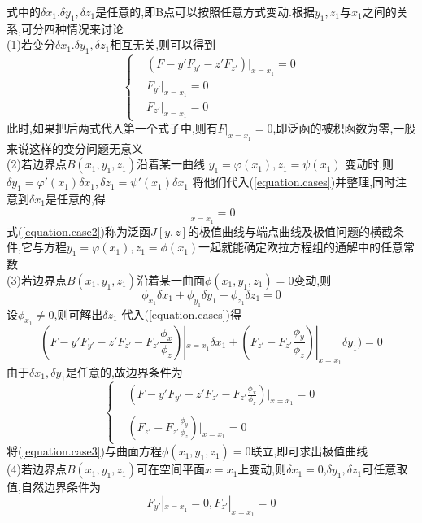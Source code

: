 \documentclass{book}
\begin{document}
式中的$\delta x_1.\delta y_1,\delta z_1$是任意的,即B点可以按照任意方式变动.根据$y_1,z_1与x_1$之间的关系,可分四种情况来讨论
\\
(1)若变分$\delta x_1.\delta y_1,\delta z_1$相互无关,则可以得到
$$
\left\{
  \begin{array}{ll}
     & (F - y'F_{y'} - z'F_{z'})|_{x=x_1}=0 \\
     &  F_{y'}|_{x=x_1}=0\\
     & F_{z'}|_{x=x_1}=0
  \end{array}
\right.
$$
此时,如果把后两式代入第一个式子中,则有$F|_{x=x_1}=0$,即泛函的被积函数为零,一般来说这样的变分问题无意义 \\
(2)若边界点$B(x_1,y_1,z_1)$沿着某一曲线 $y_1=\varphi(x_1),z_1=\psi(x_1)$ 变动时,则
$\delta y_1=\varphi'(x_1)\delta x_1,\delta z_1=\psi'(x_1)\delta x_1$
将他们代入(\ref{equation.cases})并整理,同时注意到$\delta x_1$是任意的,得
\begin{equation}
 [F + (\varphi' - y')F_{y'} + (\psi' -z')F_{z'}]|_{x=x_1}=0
\label{equation.case2}
\end{equation}
式(\ref{equation.case2})称为泛函$J[y,z]$的极值曲线与端点曲线及极值问题的横截条件,它与方程$y_1=\varphi(x_1),z_1=\phi(x_1)$一起就能确定欧拉方程组的通解中的任意常数 \\
(3)若边界点$B(x_1,y_1,z_1)$沿着某一曲面$\phi(x_1,y_1,z_1)=0$变动,则
\begin{equation}
 \phi_{x_1}\delta x_1+
 \phi_{y_1}\delta y_1+
 \phi_{z_1}\delta z_1=0
\end{equation}
设$\phi_{x_1}\neq 0$,则可解出$\delta z_1$
代入(\ref{equation.cases})得
\begin{equation}
(F - y'F_{y'} - z'F_{z'} - F_{z'}\frac{\phi_x}{\phi_z})|_{x=x_1} \delta x_1 +
(F_{z'} -F_{z'}\frac{\phi_y}{\phi_z})|_{x=x_1} \delta y_1  )
=0
\end{equation}
由于$\delta x_1,\delta y_1$是任意的,故边界条件为
\begin{equation}
\left\{
  \begin{array}{lll}
     & (F - y'F_{y'} - z'F_{z'} - F_{z'}\frac{\phi_x}{\phi_z})|_{x=x_1} =0 \\
&\\
    & (F_{z'} -F_{z'}\frac{\phi_y}{\phi_z})|_{x=x_1} =0
  \end{array}
\right.
\label{equation.case3}
\end{equation}
将(\ref{equation.case3})与曲面方程$\phi(x_1,y_1,z_1)=0$联立,即可求出极值曲线 \\
(4)若边界点$B(x_1,y_1,z_1)$可在空间平面$x=x_1$上变动,则$\delta x_1=0$,$\delta y_1,\delta z_1$可任意取值,自然边界条件为
\begin{equation}
F_{y'}|_{x=x_1}=0,
F_{z'}|_{x=x_1}=0
\end{equation}
\end{document}
